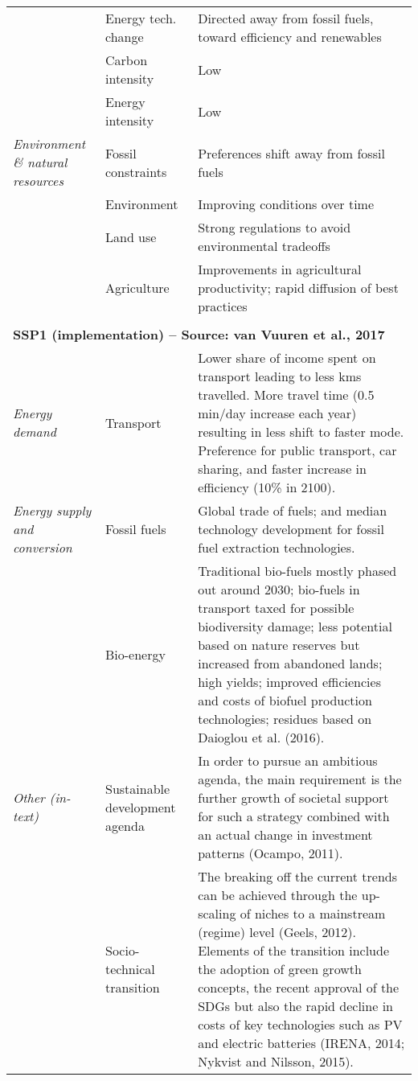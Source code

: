 {\begin{longtable}{p{3cm}p{3.5cm}p{8cm}}
\textit{} & Energy tech. change & Directed away from fossil fuels, toward efficiency and renewables\\
\textit{} & Carbon intensity & Low\\
\textit{} & Energy intensity & Low\\
\textit{Environment \& natural resources} & Fossil constraints & Preferences shift away from fossil fuels\\
\textit{} & Environment & Improving conditions over time\\
\textit{} & Land use & Strong regulations to avoid environmental tradeoffs\\
\textit{} & Agriculture & Improvements in agricultural productivity; rapid diffusion of best practices\\ && \\
\multicolumn{3}{l}{\textbf{SSP1 (implementation) -- Source: van Vuuren et al., 2017}}\\
\textit{Energy demand} & Transport & Lower share of income spent on transport leading to less kms travelled. More travel time (0.5 min/day increase each year) resulting in less shift to faster mode. Preference for public transport, car sharing, and faster increase in efficiency (10\% in 2100).\\
\textit{Energy supply and conversion} & Fossil fuels & Global trade of fuels; and median technology development for fossil fuel extraction technologies.\\
\textit{} & Bio-energy & Traditional bio-fuels mostly phased out around 2030; bio-fuels in transport taxed for possible biodiversity damage; less potential based on nature reserves but increased from abandoned lands; high yields; improved efficiencies and costs of biofuel production technologies; residues based on Daioglou et al. (2016).\\
\textit{Other (in-text)} & Sustainable development agenda & In order to pursue an ambitious agenda, the main requirement is the further growth of societal support for such a strategy combined with an actual change in investment patterns (Ocampo, 2011).\\
\textit{} & Socio-technical transition & The breaking off the current trends can be achieved through the up-scaling of niches to a mainstream (regime) level (Geels, 2012). Elements of the transition include the adoption of green growth concepts, the recent approval of the SDGs but also the rapid decline in costs of key technologies such as PV and electric batteries (IRENA, 2014; Nykvist and Nilsson, 2015).\\

\end{longtable}}

